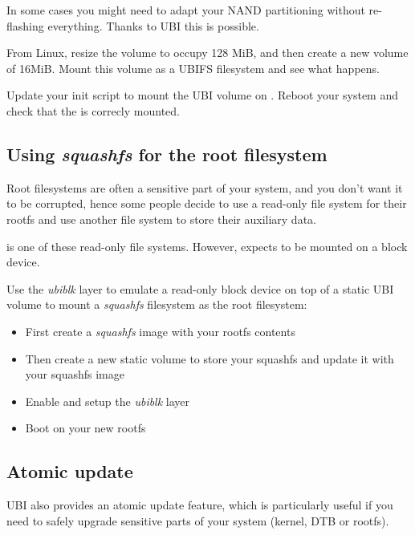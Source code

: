 In some cases you might need to adapt your NAND partitioning without
re-flashing everything. Thanks to UBI this is possible.

From Linux, resize the  volume to occupy 128 MiB,
and then create a new  volume of 16MiB. Mount this
volume as a UBIFS filesystem and see what happens.

Update your init script to mount the UBI  volume on .
Reboot your system and check that the  is correcly mounted.

%
%

\subsection{Using {\em squashfs} for the root filesystem}

Root filesystems are often a sensitive part of your system, and you don't
want it to be corrupted, hence some people decide to use a read-only
file system for their rootfs and use another file system to store their
auxiliary data.

 is one of these read-only file systems. However,
 expects to be mounted on a block device.

Use the {\em ubiblk} layer to emulate a read-only block device on top
of a static UBI volume to mount a {\em squashfs} filesystem as the
root filesystem:

\begin{itemize}
  \item First create a {\em squashfs} image with your rootfs contents
  \item Then create a new static volume to store your squashfs and update it with
    your squashfs image
  \item Enable and setup the {\em ubiblk} layer
  \item Boot on your new rootfs
\end{itemize}


\subsection{Atomic update}

UBI also provides an atomic update feature, which is particularly useful
if you need to safely upgrade sensitive parts of your system (kernel,
DTB or rootfs).

